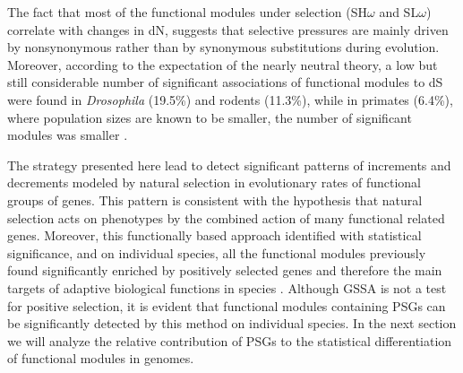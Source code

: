 The fact that most of the functional modules under selection (SH$\omega$ and SL$\omega$) correlate with changes in dN, suggests that selective pressures are mainly driven by nonsynonymous rather than by synonymous substitutions during evolution. Moreover, according to the expectation of the nearly neutral theory, a low but still considerable number of significant associations of functional modules to dS were found in \textit{Drosophila} (19.5\%) and rodents (11.3\%), while in primates (6.4\%), where population sizes are known to be smaller, the number of significant modules was smaller \cite{Petit2009}.

The strategy presented here lead to detect significant patterns of increments and decrements modeled by natural selection in evolutionary rates of functional groups of genes. This pattern is consistent with the hypothesis that natural selection acts on phenotypes by the combined action of many functional related genes. Moreover, this functionally based approach identified with statistical significance, and on individual species, all the functional modules previously found significantly enriched by positively selected genes and therefore the main targets of adaptive biological functions in species . Although GSSA is not a test for positive selection, it is evident that functional modules containing PSGs can be significantly detected by this method on individual species. In the next section we will analyze the relative contribution of PSGs to the statistical differentiation of functional modules in genomes.


